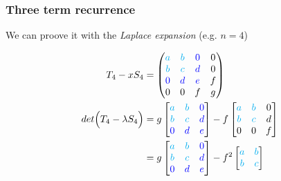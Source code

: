 \documentclass{beamer}
\theoremstyle{definition} \newtheorem{de}{Def}
\theoremstyle{remark} \newtheorem{os}[de]{Oss}
\theoremstyle{plain} \newtheorem{te}[de]{Teo}
\theoremstyle{plain} \newtheorem{co}[de]{Cor}
\theoremstyle{plain} \newtheorem{pr}[de]{Prop}
\theoremstyle{plain} \newtheorem{lem}[de]{Lemm}
\theoremstyle{remark} \newtheorem{rem}[de]{Remark}
\begin{document}
\begin{frame}
  \frametitle{Three term recurrence}

  We can proove it with the \emph{Laplace expansion} (e.g. $n=4$)

  \begin{align*}
    T_4 - x S_4  &= \begin{pmatrix} 
      \textcolor{cyan}{a} & \textcolor{cyan}{b} & \textcolor{blue}{0} & 0\\
      \textcolor{cyan}{b} & \textcolor{cyan}{c} & \textcolor{blue}{d} & 0\\
      \textcolor{blue}{0} & \textcolor{blue}{d} & \textcolor{blue}{e} & f\\
      0 & 0 & f & g
    \end{pmatrix} \\
    det \Big( T_4 - \lambda S_4 \Big) &= g \begin{bmatrix}
      \textcolor{cyan}{a} & \textcolor{cyan}{b} & \textcolor{blue}{0}\\
      \textcolor{cyan}{b} & \textcolor{cyan}{c} & \textcolor{blue}{d}\\
      \textcolor{blue}{0} & \textcolor{blue}{d} & \textcolor{blue}{e}
    \end{bmatrix} -f \begin{bmatrix}
      \textcolor{cyan}{a} & \textcolor{cyan}{b} & 0\\
      \textcolor{cyan}{b} & \textcolor{cyan}{c} & d\\
      0 & 0 & f
    \end{bmatrix}\\
    &= g \begin{bmatrix} 
      \textcolor{cyan}{a} & \textcolor{cyan}{b} & \textcolor{blue}{0}\\
      \textcolor{cyan}{b} & \textcolor{cyan}{c} & \textcolor{blue}{d}\\
      \textcolor{blue}{0} & \textcolor{blue}{d} & \textcolor{blue}{e}
    \end{bmatrix} - f^2 \begin{bmatrix} 
      \textcolor{cyan}{a} & \textcolor{cyan}{b} \\ 
      \textcolor{cyan}{b} & \textcolor{cyan}{c} 
    \end{bmatrix}
  \end{align*}

\end{frame}
\end{document}
